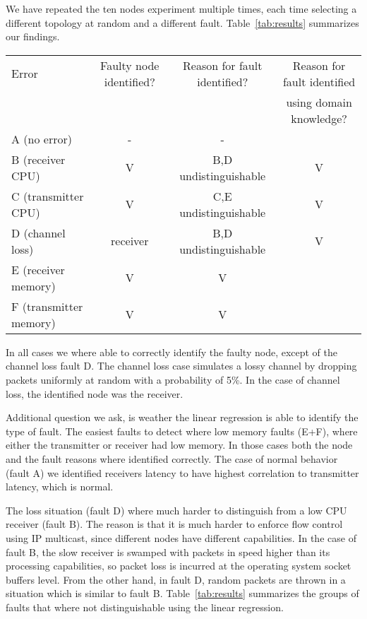 \documentclass[times, 10pt,twocolumn]{article}
\begin{document}
We have repeated the ten nodes experiment multiple times, each time selecting a different topology at random
and a different fault. Table~\ref{tab:results} summarizes our findings.
\begin{table*}[ht!]
  \centering
\begin{tabular}{|l|c|c|c|}
  \hline
  Error & Faulty node identified? & Reason for fault identified? & Reason for fault identified\\
  & & & using domain knowledge? \\ \hline
A (no error) & - & - &\\
  B (receiver CPU) & V & B,D undistinguishable & V\\
  C (transmitter CPU) & V & C,E undistinguishable & V\\
  D (channel loss) & receiver &  B,D undistinguishable & V\\
  E (receiver memory) & V & V & \\
  F (transmitter memory) & V & V & \\
   \hline
\end{tabular}
  \caption{Summary of results for the randomly constructed ten nodes overlays.}\label{tab:results}
\end{table*}
In all cases we where able to correctly identify the faulty node, except of the channel loss fault D.
The channel loss case simulates a lossy channel by dropping packets uniformly at random with
a probability of 5\%. In the case of channel loss, the identified node was the receiver.

Additional question we ask, is weather the linear regression is able to identify the type of fault.
The easiest faults to detect where low memory faults (E+F), where either the transmitter or receiver had low memory. In those cases both the node and the fault reasons where identified correctly. The case of normal behavior (fault A) we identified receivers latency to have highest correlation to transmitter latency, which is normal.

The loss situation (fault D) where much harder to distinguish from a low CPU receiver (fault B). The reason
is that it is much harder to enforce flow control using IP multicast, since different nodes have different capabilities. In the case of fault B, the slow receiver is swamped with packets in speed higher than its processing capabilities, so packet
loss is incurred at the operating system socket buffers level. From the other hand, in fault D, random packets
are thrown in a situation which is similar to fault B. Table~\ref{tab:results} summarizes the groups of faults that where not distinguishable using the linear regression.
\end{document}
